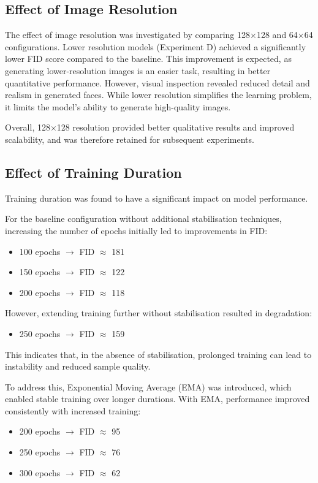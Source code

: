 \documentclass[conference]{IEEEtran}
\begin{document}
\subsection{Effect of Image Resolution}

The effect of image resolution was investigated by comparing 128$\times$128 and 64$\times$64 configurations. Lower resolution models (Experiment D) achieved a significantly lower FID score compared to the baseline. This improvement is expected, as generating lower-resolution images is an easier task, resulting in better quantitative performance. However, visual inspection revealed reduced detail and realism in generated faces. While lower resolution simplifies the learning problem, it limits the model's ability to generate high-quality images.

Overall, 128$\times$128 resolution provided better qualitative results and improved scalability, and was therefore retained for subsequent experiments.


\subsection{Effect of Training Duration}

Training duration was found to have a significant impact on model performance.

For the baseline configuration without additional stabilisation techniques, increasing the number of epochs initially led to improvements in FID:
\begin{itemize}
    \item 100 epochs $\rightarrow$ FID $\approx$ 181
    \item 150 epochs $\rightarrow$ FID $\approx$ 122
    \item 200 epochs $\rightarrow$ FID $\approx$ 118
\end{itemize}

However, extending training further without stabilisation resulted in degradation:
\begin{itemize}
    \item 250 epochs $\rightarrow$ FID $\approx$ 159
\end{itemize}

This indicates that, in the absence of stabilisation, prolonged training can lead to instability and reduced sample quality.

To address this, Exponential Moving Average (EMA) was introduced, which enabled stable training over longer durations. With EMA, performance improved consistently with increased training:
\begin{itemize}
    \item 200 epochs $\rightarrow$ FID $\approx$ 95
    \item 250 epochs $\rightarrow$ FID $\approx$ 76
    \item 300 epochs $\rightarrow$ FID $\approx$ 62
\end{itemize}
\end{document}
